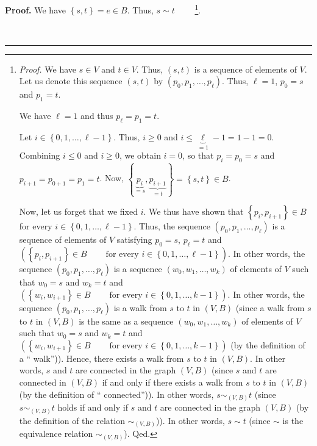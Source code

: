 \documentclass[numbers=enddot,12pt,final,onecolumn,notitlepage]{scrartcl}%
\theoremstyle{definition}
\newenvironment{proof}[1][Proof]{\noindent\textbf{#1.} }{\ \rule{0.5em}{0.5em}}
\newenvironment{verlong}{}{}
\begin{document}
\begin{verlong}
\begin{proof}
We have $\left\{  s,t\right\}  =e\in B$. Thus, $s\sim t$%
\ \ \ \ \footnote{\textit{Proof.} We have $s\in V$ and $t\in V$. Thus,
$\left(  s,t\right)  $ is a sequence of elements of $V$. Let us denote this
sequence $\left(  s,t\right)  $ by $\left(  p_{0},p_{1},\ldots,p_{\ell
}\right)  $. Thus, $\ell=1$, $p_{0}=s$ and $p_{1}=t$.
\par
We have $\ell=1$ and thus $p_{\ell}=p_{1}=t$.
\par
Let $i\in\left\{  0,1,\ldots,\ell-1\right\}  $. Thus, $i\geq0$ and
$i\leq\underbrace{\ell}_{=1}-1=1-1=0$. Combining $i\leq0$ and $i\geq0$, we
obtain $i=0$, so that $p_{i}=p_{0}=s$ and $p_{i+1}=p_{0+1}=p_{1}=t$. Now,
$\left\{  \underbrace{p_{i}}_{=s},\underbrace{p_{i+1}}_{=t}\right\}  =\left\{
s,t\right\}  \in B$.
\par
Now, let us forget that we fixed $i$. We thus have shown that $\left\{
p_{i},p_{i+1}\right\}  \in B$ for every $i\in\left\{  0,1,\ldots
,\ell-1\right\}  $. Thus, the sequence $\left(  p_{0},p_{1},\ldots,p_{\ell
}\right)  $ is a sequence of elements of $V$ satisfying $p_{0}=s$, $p_{\ell
}=t$ and $\left(  \left\{  p_{i},p_{i+1}\right\}  \in
B\ \ \ \ \ \ \ \ \ \ \text{for every }i\in\left\{  0,1,\ldots,\ell-1\right\}
\right)  $. In other words, the sequence $\left(  p_{0},p_{1},\ldots,p_{\ell
}\right)  $ is a sequence $\left(  w_{0},w_{1},\ldots,w_{k}\right)  $ of
elements of $V$ such that $w_{0}=s$ and $w_{k}=t$ and $\left(  \left\{
w_{i},w_{i+1}\right\}  \in B\ \ \ \ \ \ \ \ \ \ \text{for every }i\in\left\{
0,1,\ldots,k-1\right\}  \right)  $. In other words, the sequence $\left(
p_{0},p_{1},\ldots,p_{\ell}\right)  $ is a walk from $s$ to $t$ in $\left(
V,B\right)  $ (since a walk from $s$ to $t$ in $\left(  V,B\right)  $ is the
same as a sequence $\left(  w_{0},w_{1},\ldots,w_{k}\right)  $ of elements of
$V$ such that $w_{0}=s$ and $w_{k}=t$ and $\left(  \left\{  w_{i}%
,w_{i+1}\right\}  \in B\ \ \ \ \ \ \ \ \ \ \text{for every }i\in\left\{
0,1,\ldots,k-1\right\}  \right)  $ (by the definition of a \textquotedblleft
walk\textquotedblright)). Hence, there exists a walk from $s$ to $t$ in
$\left(  V,B\right)  $. In other words, $s$ and $t$ are connected in the graph
$\left(  V,B\right)  $ (since $s$ and $t$ are connected in $\left(
V,B\right)  $ if and only if there exists a walk from $s$ to $t$ in $\left(
V,B\right)  $ (by the definition of \textquotedblleft
connected\textquotedblright)). In other words, $s\sim_{\left(  V,B\right)  }t$
(since $s\sim_{\left(  V,B\right)  }t$ holds if and only if $s$ and $t$ are
connected in the graph $\left(  V,B\right)  $ (by the definition of the
relation $\sim_{\left(  V,B\right)  }$)). In other words, $s\sim t$ (since
$\sim$ is the equivalence relation $\sim_{\left(  V,B\right)  }$). Qed.}.


\end{proof}
\end{verlong}
\end{document}
